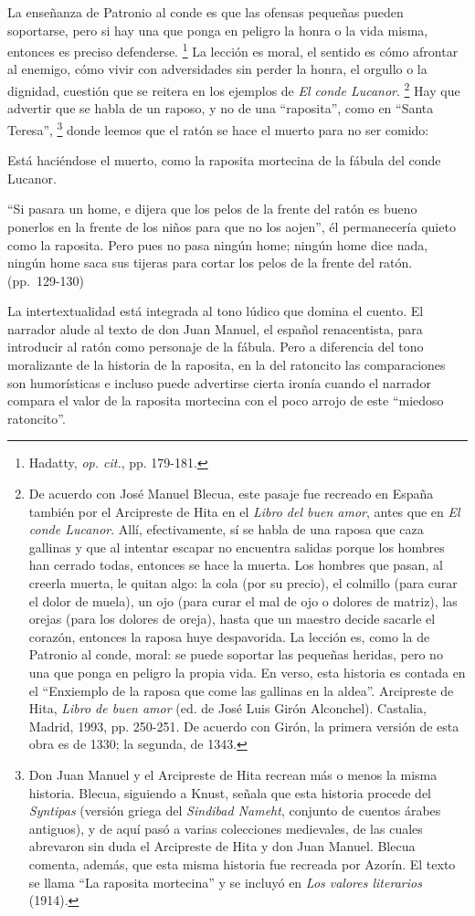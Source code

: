 \documentclass[14pt,twoside,final]{extbook} %
\let\oldfootnote\footnote
\renewcommand\footnote[1]{%
\oldfootnote{\hspace{1mm}#1}}
\begin{document}
La enseñanza de Patronio al conde es que las ofensas pequeñas pueden soportarse, pero si hay una que ponga en peligro la honra o la vida misma, entonces es preciso defenderse.\footnote{Hadatty, \emph{op. cit.}, pp. 179-181. } La lección es moral, el sentido es cómo afrontar al enemigo, cómo vivir con adversidades sin perder la honra, el orgullo o la dignidad, cuestión que se reitera en los ejemplos de \emph{El conde Lucanor}.\footnote{De acuerdo con José Manuel Blecua, este pasaje fue recreado en España también por el Arcipreste de Hita en el \emph{Libro del buen amor}, antes que en \emph{El conde Lucanor}. Allí, efectivamente, sí se habla de una raposa que caza gallinas y que al intentar escapar no encuentra salidas porque los hombres han cerrado todas, entonces se hace la muerta. Los hombres que pasan, al creerla muerta, le quitan algo: la cola (por su precio), el colmillo (para curar el dolor de muela), un ojo (para curar el mal de ojo o dolores de matriz), las orejas (para los dolores de oreja), hasta que un maestro decide sacarle el corazón, entonces la raposa huye despavorida. La lección es, como la de Patronio al conde, moral: se puede soportar las pequeñas heridas, pero no una que ponga en peligro la propia vida. En verso, esta historia es contada en el ``Enxiemplo de la raposa que come las gallinas en la aldea''. Arcipreste de Hita, \emph{Libro de buen amor} (ed. de José Luis Girón Alconchel). Castalia, Madrid, 1993, pp. 250-251. De acuerdo con Girón, la primera versión de esta obra es de 1330; la segunda, de 1343.} Hay que advertir que se habla de un raposo, y no de una ``raposita'', como en ``Santa Teresa'',\footnote{Don Juan Manuel y el Arcipreste de Hita recrean más o menos la misma historia. Blecua, siguiendo a Knust, señala que esta historia procede del \emph{Syntipas} (versión griega del \emph{Sindibad Nameht}, conjunto de cuentos árabes antiguos), y de aquí pasó a varias colecciones medievales, de las cuales abrevaron sin duda el Arcipreste de Hita y don Juan Manuel. Blecua comenta, además, que esta misma historia fue recreada por Azorín. El texto se llama ``La raposita mortecina'' y se incluyó en \emph{Los valores literarios} (1914).} donde leemos que el ratón se hace el muerto para no ser comido:
\begin{quoting}
Está haciéndose el muerto, como la raposita mortecina de la fábula del conde Lucanor.

``Si pasara un home, e dijera que los pelos de la frente del ratón es bueno ponerlos en la frente de los niños para que no los aojen'', él permanecería quieto como la raposita. Pero pues no pasa ningún home; ningún home dice nada, ningún home saca sus tijeras para cortar los pelos de la frente del ratón. (pp.~129-130)
\end{quoting}
La intertextualidad está integrada al tono lúdico que domina el cuento. El narrador alude al texto de don Juan Manuel, el español renacentista, para introducir al ratón como personaje de la fábula. Pero a diferencia del tono moralizante de la historia de la raposita, en la del ratoncito las comparaciones son humorísticas e incluso puede advertirse cierta ironía cuando el narrador compara el valor de la raposita mortecina con el poco arrojo de este ``miedoso ratoncito''.
\end{document}
